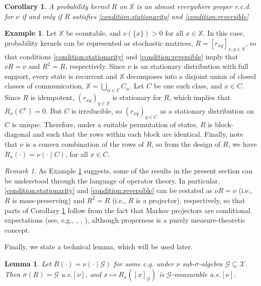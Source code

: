 \documentclass[a4paper]{article}
\theoremstyle{plain}
\newtheorem{corollary}[theorem]{Corollary}
\newtheorem{lemma}[theorem]{Lemma}
\theoremstyle{remark}
\newtheorem{remark}[theorem]{Remark}
\theoremstyle{definition}
\newtheorem{example}[theorem]{Example}
\begin{document}
\begin{corollary}\label{result:prelim:kernels:s+r-rcd}
A probability kernel $R$ on $\mathbb{X}$ is an almost everywhere proper r.c.d. for $\nu$ if and only if $R$ satisfies \eqref{condition:stationarity} and \eqref{condition:reversible}
\end{corollary}

\begin{example}\label{result:prelim:kernels:s+r-rcd:example}
Let $\mathbb{X}$ be countable, and $\nu(\{x\})>0$ for all $x\in\mathbb{X}$. In this case, probability kernels can be represented as stochastic matrices, $R=[r_{xy}]_{x,y\in\mathbb{X}}$, so that conditions \eqref{condition:stationarity} and \eqref{condition:reversible} imply that $\nu R=\nu$ and $R^2=R$, respectively. Since $\nu$ is an stationary distribution with full support, every state is recurrent and $\mathbb{X}$ decomposes into a disjoint union of closed classes of communication, $\mathbb{X}=\bigcup_{\alpha\in\Gamma}C_\alpha$. Let $C$ be one such class, and $x\in C$. Since $R$ is idempotent, $(r_{xy})_{y\in\mathbb{X}}$ is stationary for $R$, which implies that $R_x(C^c)=0$. But $C$ is irreducible, so $(r_{xy})_{y\in C}$ as a stationary distribution on $C$ is unique. Therefore, under a suitable permutation of states, $R$ is block-diagonal and such that the rows within each block are identical. Finally, note that $\nu$ is a convex combination of the rows of $R$, so from the design of $R$, we have $R_x(\cdot)=\nu(\cdot\mid C)$, for all $x\in C$.
\end{example}

\begin{remark}\label{result:prelim:kernels:s+r-rcd:remark}
As Example \ref{result:prelim:kernels:s+r-rcd:example} suggests, some of the results in the present section can be understood through the language of operator theory. In particular, \eqref{condition:stationarity} and \eqref{condition:reversible} can be restated as $\nu R=\nu$ (i.e., $R$ is mass-preserving) and $R^2=R$ (i.e., $R$ is a projector), respectively, so that parts of Corollary \ref{result:prelim:kernels:s+r-rcd} follow from the fact that Markov projectors are conditional expectations (see, e.g., \cite{douglas1965}, \citet[][Section II.6.10]{blackadar2006}, \cite{dodds1990}), although properness is a purely measure-theoretic concept.
\end{remark}

Finally, we state a technical lemma, which will be used later.

\begin{lemma}\label{atoms_general:mixture:lemma}
Let $R(\cdot)=\nu(\cdot\mid\mathcal{G})$ for some c.g. under $\nu$ sub-$\sigma$-algebra $\mathcal{G}\subseteq\mathcal{X}.$ Then $\sigma(R)=\mathcal{G}$ a.e.$[\nu]$, and $x\mapsto R_x([x]_\mathcal{G})$ is $\mathcal{G}$-measurable a.e.$[\nu]$.
\end{lemma}
\end{document}
